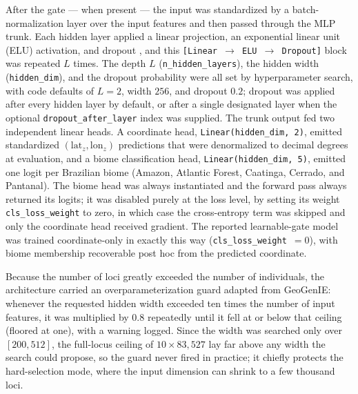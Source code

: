 \documentclass[twocolumn,10pt]{article}
\begin{document}
After the gate --- when present --- the input was standardized by a batch-normalization layer over
the input features and then passed through the MLP trunk. Each hidden layer applied a linear
projection, an exponential linear unit (ELU) activation, and dropout \citep{srivastava2014dropout},
and this \texttt{[Linear~$\to$~ELU~$\to$~Dropout]} block was repeated $L$ times. The depth $L$
(\texttt{n\_hidden\_layers}), the hidden width (\texttt{hidden\_dim}), and the dropout probability
were all set by hyperparameter search, with code defaults of $L=2$, width $256$, and dropout $0.2$;
dropout was applied after every hidden layer by default, or after a single designated layer when the
optional \texttt{dropout\_after\_layer} index was supplied. The trunk output fed two independent
linear heads. A coordinate head, \texttt{Linear(hidden\_dim,~2)}, emitted standardized
$(\mathrm{lat}_z, \mathrm{lon}_z)$ predictions that were denormalized to decimal degrees at
evaluation, and a biome classification head, \texttt{Linear(hidden\_dim,~5)}, emitted one logit per
Brazilian biome (Amazon, Atlantic Forest, Caatinga, Cerrado, and Pantanal). The biome head was
always instantiated and the forward pass always returned its logits; it was disabled purely at the
loss level, by setting its weight \texttt{cls\_loss\_weight} to zero, in which case the
cross-entropy term was skipped and only the coordinate head received gradient. The reported
learnable-gate model was trained coordinate-only in exactly this way
(\texttt{cls\_loss\_weight}~$=0$), with biome membership recoverable post hoc from the predicted
coordinate.

Because the number of loci greatly exceeded the number of individuals, the architecture carried an
overparameterization guard adapted from GeoGenIE: whenever the requested hidden width exceeded ten
times the number of input features, it was multiplied by $0.8$ repeatedly until it fell at or below
that ceiling (floored at one), with a warning logged. Since the width was searched only over $[200,
512]$, the full-locus ceiling of $10 \times 83{,}527$ lay far above any width the search could
propose, so the guard never fired in practice; it chiefly protects the hard-selection mode, where
the input dimension can shrink to a few thousand loci.
\end{document}
